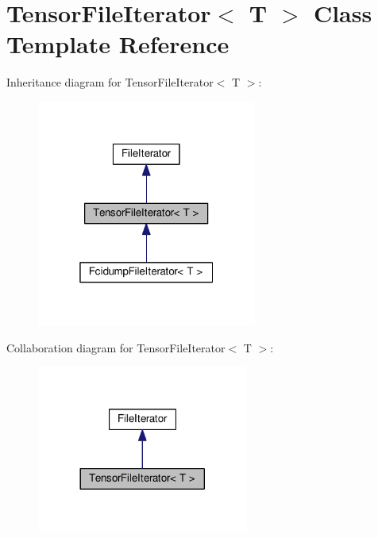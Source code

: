 \hypertarget{classTensorFileIterator}{}\section{Tensor\+File\+Iterator$<$ T $>$ Class Template Reference}
\label{classTensorFileIterator}


Inheritance diagram for Tensor\+File\+Iterator$<$ T $>$\+:\nopagebreak
\begin{figure}[H]
\begin{center}
\leavevmode
\includegraphics[width=205pt]{classTensorFileIterator__inherit__graph}
\end{center}
\end{figure}


Collaboration diagram for Tensor\+File\+Iterator$<$ T $>$\+:\nopagebreak
\begin{figure}[H]
\begin{center}
\leavevmode
\includegraphics[width=197pt]{classTensorFileIterator__coll__graph}
\end{center}
\end{figure}
